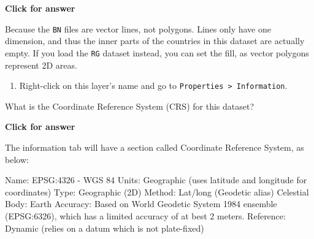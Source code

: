 \documentclass[
  letterpaper,
  DIV=11,
  numbers=noendperiod]{scrreprt}
\providecommand{\tightlist}{%
  \setlength{\itemsep}{0pt}\setlength{\parskip}{0pt}}\usepackage{longtable,booktabs,array}
\begin{document}
\begin{tcolorbox}[enhanced jigsaw, toprule=.15mm, breakable, left=2mm, colframe=quarto-callout-important-color-frame, colback=white, arc=.35mm, leftrule=.75mm, opacityback=0, rightrule=.15mm, bottomrule=.15mm]

\vspace{-3mm}\textbf{Click for answer}\vspace{3mm}

Because the \texttt{BN} files are vector lines, not polygons. Lines only
have one dimension, and thus the inner parts of the countries in this
dataset are actually empty. If you load the \texttt{RG} dataset instead,
you can set the fill, as vector polygons represent 2D areas.

\end{tcolorbox}

\begin{enumerate}
\def\labelenumi{(\arabic{enumi})}
\setcounter{enumi}{49}
\tightlist
\item
  Right-click on this layer's name and go to
  \texttt{Properties\ \textgreater{}\ Information}.
\end{enumerate}

\begin{tcolorbox}[enhanced jigsaw, coltitle=black, toprule=.15mm, breakable, opacitybacktitle=0.6, left=2mm, colback=white, leftrule=.75mm, rightrule=.15mm, colbacktitle=quarto-callout-important-color!10!white, toptitle=1mm, titlerule=0mm, colframe=quarto-callout-important-color-frame, arc=.35mm, bottomtitle=1mm, opacityback=0, bottomrule=.15mm, title=\textcolor{quarto-callout-important-color}{\faExclamation}\hspace{0.5em}{Stop and Think}]

What is the Coordinate Reference System (CRS) for this dataset?

\end{tcolorbox}

\begin{tcolorbox}[enhanced jigsaw, toprule=.15mm, breakable, left=2mm, colframe=quarto-callout-important-color-frame, colback=white, arc=.35mm, leftrule=.75mm, opacityback=0, rightrule=.15mm, bottomrule=.15mm]

\vspace{-3mm}\textbf{Click for answer}\vspace{3mm}

The information tab will have a section called Coordinate Reference
System, as below:

Name: EPSG:4326 - WGS 84 Units: Geographic (uses latitude and longitude
for coordinates) Type: Geographic (2D) Method: Lat/long (Geodetic alias)
Celestial Body: Earth Accuracy: Based on World Geodetic System 1984
ensemble (EPSG:6326), which has a limited accuracy of at best 2 meters.
Reference: Dynamic (relies on a datum which is not plate-fixed)

\end{tcolorbox}
\end{document}
